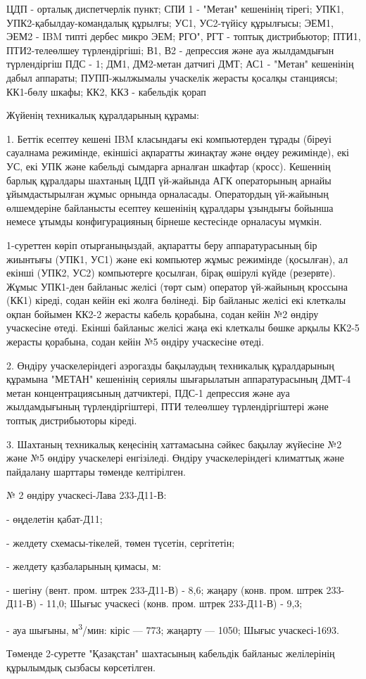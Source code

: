 \begin{multicols}{2}
ЦДП - орталық диспетчерлік пункт; СПИ 1 - "Метан" кешенінің тірегі;
УПК1, УПК2-қабылдау-командалық құрылғы; УС1, УС2-түйісу құрылғысы; ЭЕМ1,
ЭЕМ2 - IBM типті дербес микро ЭЕМ; РГО", РГТ - топтық дистрибьютор;
ПТИ1, ПТИ2-телеөлшеу түрлендіргіші; В1, В2 - депрессия және ауа
жылдамдығын түрлендіргіш ПДС - 1; ДМ1, ДМ2-метан датчигі ДМТ; АС1 -
"Метан" кешенінің дабыл аппараты; ПУПП-жылжымалы учаскелік жерасты
қосалқы станциясы; КК1-бөлу шкафы; КК2, ККЗ - кабельдік қорап

Жүйенің техникалық құралдарының құрамы:

1. Беттік есептеу кешені IBM класындағы екі компьютерден тұрады (біреуі
сауалнама режимінде, екіншісі ақпаратты жинақтау және өңдеу режимінде),
екі УС, екі УПК және кабельді сымдарға арналған шкафтар (кросс).
Кешеннің барлық құралдары шахтаның ЦДП үй-жайында АГК операторының
арнайы ұйымдастырылған жұмыс орнында орналасады. Оператордың үй-жайының
өлшемдеріне байланысты есептеу кешенінің құралдары ұзындығы бойынша
немесе ұтымды конфигурацияның бірнеше кестесінде орналасуы мүмкін.

1-суреттен көріп отырғаныңыздай, ақпаратты беру аппаратурасының бір
жиынтығы (УПК1, УС1) және екі компьютер жұмыс режимінде (қосылған), ал
екінші (УПК2, УС2) компьютерге қосылған, бірақ өшірулі күйде (резервте).
Жұмыс УПК1-ден байланыс желісі (төрт сым) оператор үй-жайының кроссына
(КК1) кіреді, содан кейін екі жолға бөлінеді. Бір байланыс желісі екі
клеткалы оқпан бойымен КК2-2 жерасты кабель қорабына, содан кейін №2
өндіру учаскесіне өтеді. Екінші байланыс желісі жаңа екі клеткалы бөшке
арқылы КК2-5 жерасты қорабына, содан кейін №5 өндіру учаскесіне өтеді.

2. Өндіру учаскелеріндегі аэрогазды бақылаудың техникалық құралдарының
құрамына "МЕТАН" кешенінің сериялы шығарылатын аппаратурасының ДМТ-4
метан концентрациясының датчиктері, ПДС-1 депрессия және ауа
жылдамдығының түрлендіргіштері, ПТИ телеөлшеу түрлендіргіштері және
топтық дистрибьюторы кіреді.

3. Шахтаның техникалық кеңесінің хаттамасына сәйкес бақылау жүйесіне №2
және №5 өндіру учаскелері енгізіледі. Өндіру учаскелеріндегі климаттық
және пайдалану шарттары төменде келтірілген.

№ 2 өндіру учаскесі-Лава 233-Д11-В:

- өңделетін қабат-Д11;

- желдету схемасы-тікелей, төмен түсетін, сергітетін;

- желдету қазбаларының қимасы, м:

- шегіну (вент. пром. штрек 233-Д11-В) - 8,6; жаңару (конв. пром. штрек
233-Д11-В) - 11,0; Шығыс учаскесі (конв. пром. штрек 233-Д11-В) - 9,3;

- ауа шығыны, м\textsuperscript{3}/мин: кіріс --- 773; жаңарту --- 1050;
Шығыс учаскесі-1693.

Төменде 2-суретте "Қазақстан" шахтасының кабельдік байланыс желілерінің
құрылымдық сызбасы көрсетілген.
\end{multicols}


